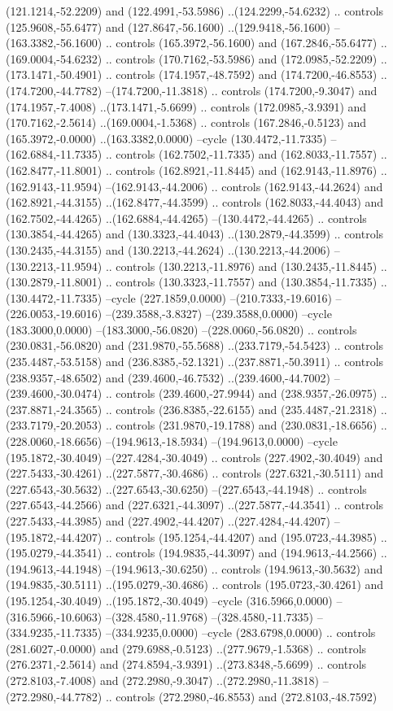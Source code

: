 \begin{scope}[shift={(55,258)}]
(121.1214,-52.2209) and (122.4991,-53.5986) ..(124.2299,-54.6232) .. controls (125.9608,-55.6477) and (127.8647,-56.1600) ..(129.9418,-56.1600) --(163.3382,-56.1600) .. controls (165.3972,-56.1600) and (167.2846,-55.6477) ..(169.0004,-54.6232) .. controls (170.7162,-53.5986) and (172.0985,-52.2209) ..(173.1471,-50.4901) .. controls (174.1957,-48.7592) and (174.7200,-46.8553) ..(174.7200,-44.7782) --(174.7200,-11.3818) .. controls (174.7200,-9.3047) and (174.1957,-7.4008) ..(173.1471,-5.6699) .. controls (172.0985,-3.9391) and (170.7162,-2.5614) ..(169.0004,-1.5368) .. controls (167.2846,-0.5123) and (165.3972,-0.0000) ..(163.3382,0.0000) --cycle (130.4472,-11.7335) --(162.6884,-11.7335) .. controls (162.7502,-11.7335) and (162.8033,-11.7557) ..(162.8477,-11.8001) .. controls (162.8921,-11.8445) and (162.9143,-11.8976) ..(162.9143,-11.9594) --(162.9143,-44.2006) .. controls (162.9143,-44.2624) and (162.8921,-44.3155) ..(162.8477,-44.3599) .. controls (162.8033,-44.4043) and (162.7502,-44.4265) ..(162.6884,-44.4265) --(130.4472,-44.4265) .. controls (130.3854,-44.4265) and (130.3323,-44.4043) ..(130.2879,-44.3599) .. controls (130.2435,-44.3155) and (130.2213,-44.2624) ..(130.2213,-44.2006) --(130.2213,-11.9594) .. controls (130.2213,-11.8976) and (130.2435,-11.8445) ..(130.2879,-11.8001) .. controls (130.3323,-11.7557) and (130.3854,-11.7335) ..(130.4472,-11.7335) --cycle (227.1859,0.0000) --(210.7333,-19.6016) --(226.0053,-19.6016) --(239.3588,-3.8327) --(239.3588,0.0000) --cycle (183.3000,0.0000) --(183.3000,-56.0820) --(228.0060,-56.0820) .. controls (230.0831,-56.0820) and (231.9870,-55.5688) ..(233.7179,-54.5423) .. controls (235.4487,-53.5158) and (236.8385,-52.1321) ..(237.8871,-50.3911) .. controls (238.9357,-48.6502) and (239.4600,-46.7532) ..(239.4600,-44.7002) --(239.4600,-30.0474) .. controls (239.4600,-27.9944) and (238.9357,-26.0975) ..(237.8871,-24.3565) .. controls (236.8385,-22.6155) and (235.4487,-21.2318) ..(233.7179,-20.2053) .. controls (231.9870,-19.1788) and (230.0831,-18.6656) ..(228.0060,-18.6656) --(194.9613,-18.5934) --(194.9613,0.0000) --cycle (195.1872,-30.4049) --(227.4284,-30.4049) .. controls (227.4902,-30.4049) and (227.5433,-30.4261) ..(227.5877,-30.4686) .. controls (227.6321,-30.5111) and (227.6543,-30.5632) ..(227.6543,-30.6250) --(227.6543,-44.1948) .. controls (227.6543,-44.2566) and (227.6321,-44.3097) ..(227.5877,-44.3541) .. controls (227.5433,-44.3985) and (227.4902,-44.4207) ..(227.4284,-44.4207) --(195.1872,-44.4207) .. controls (195.1254,-44.4207) and (195.0723,-44.3985) ..(195.0279,-44.3541) .. controls (194.9835,-44.3097) and (194.9613,-44.2566) ..(194.9613,-44.1948) --(194.9613,-30.6250) .. controls (194.9613,-30.5632) and (194.9835,-30.5111) ..(195.0279,-30.4686) .. controls (195.0723,-30.4261) and (195.1254,-30.4049) ..(195.1872,-30.4049) --cycle (316.5966,0.0000) --(316.5966,-10.6063) --(328.4580,-11.9768) --(328.4580,-11.7335) --(334.9235,-11.7335) --(334.9235,0.0000) --cycle (283.6798,0.0000) .. controls (281.6027,-0.0000) and (279.6988,-0.5123) ..(277.9679,-1.5368) .. controls (276.2371,-2.5614) and (274.8594,-3.9391) ..(273.8348,-5.6699) .. controls (272.8103,-7.4008) and (272.2980,-9.3047) ..(272.2980,-11.3818) --(272.2980,-44.7782) .. controls (272.2980,-46.8553) and (272.8103,-48.7592) 
\end{scope}
